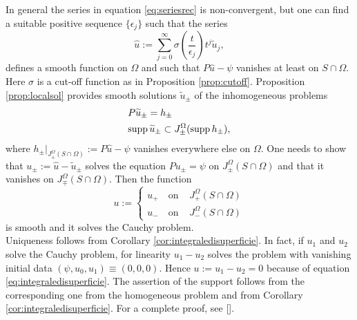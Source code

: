 In general the series in equation \eqref{eq:seriesrec} is non-convergent, but one can find a suitable positive sequence $\{\epsilon_j\}$ such that the series
\[	\widehat{u}:=\sum_{j=0}^{\infty}\sigma\left(\frac{t}{\epsilon_j}\right)t^j\widetilde{u}_j,		\]
 defines a smooth function on $\Omega$ and such that $P\widehat{u}-\psi$ vanishes at least on $S\cap\Omega$. Here $\sigma$ is a cut-off function as in Proposition \ref{prop:cutoff}. Proposition \ref{prop:localsol} provides smooth solutions $\widetilde{u}_\pm$ of the inhomogeneous problems
	\[	\begin{aligned}
&P\widetilde{u}_\pm=h_\pm\\
&\text{supp}\,\widetilde{u}_\pm\subset J_\pm^\Omega(\text{supp}\,h_\pm),
\end{aligned}		\]
where $h_\pm|_{J_\pm^\Omega(S\cap\Omega)}:=P\widehat{u}-\psi$ vanishes everywhere else on $\Omega$. One needs to show that $u_\pm:=\widehat{u}-\widetilde{u}_\pm$ solves the equation $Pu_\pm=\psi$ on $J_\pm^\Omega(S\cap\Omega)$ and that it vanishes on $J_\mp^\Omega(S\cap\Omega)$. Then the function
\[	u:=\begin{cases}
u_+\quad\text{on }& J_+^\Omega(S\cap\Omega)\\
u_-\quad\text{on }& J_-^\Omega(S\cap\Omega)
\end{cases}		\]
is smooth and it solves the Cauchy problem.\\
Uniqueness follows from Corollary \ref{cor:integraledisuperficie}. In fact, if $u_1$ and $u_2$ solve the Cauchy problem, for linearity $u_1-u_2$ solves the problem with vanishing initial data $(\psi,u_0,u_1)\equiv(0,0,0)$. Hence $u:=u_1-u_2=0$ because of equation \eqref{eq:integraledisuperficie}. The assertion of the support follows from the corresponding one from the homogeneous problem and from Corollary \ref{cor:integraledisuperficie}. For a complete proof, see [\citealp[Prop 2.4.1]{bar2}]. \endproof\\

